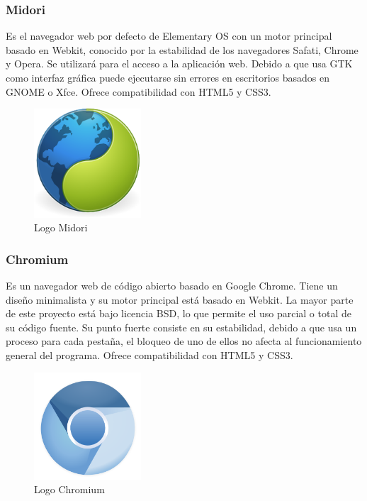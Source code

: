 		\subsubsection{Midori}
		Es el navegador web por defecto de Elementary OS con un motor principal basado en Webkit, conocido por la estabilidad de los navegadores Safati, Chrome y Opera. Se utilizará para el acceso a la aplicación web. Debido a que usa \ac{GTK} como interfaz gráfica puede ejecutarse sin errores en escritorios basados en \ac{GNOME} o Xfce.
		Ofrece compatibilidad con HTML5 y CSS3.
		
		\begin{figure}[H]
		\centering
		\includegraphics[width=40mm, fbox={\fboxrule} 4mm]{images/04-metodo/30-midori_logo.png}
		\caption{Logo Midori}
		\label{fig:midori-logo}
		\end{figure}
		
		\subsubsection{Chromium}
		Es un navegador web de código abierto basado en Google Chrome.
		Tiene un diseño minimalista y su motor principal está basado en Webkit. La mayor parte de este proyecto está bajo licencia BSD, lo que permite el uso parcial o total de su código fuente. Su punto fuerte consiste en su estabilidad, debido a que usa un proceso para cada pestaña, el bloqueo de uno de ellos no afecta al funcionamiento general del programa.
		Ofrece compatibilidad con HTML5 y CSS3.
		
		\begin{figure}[H]
		\centering
		\includegraphics[width=40mm, fbox={\fboxrule} 4mm]{images/04-metodo/39-chromium_logo.png}
		\caption{Logo Chromium}
		\label{fig:chromium-logo}
		\end{figure}
		
